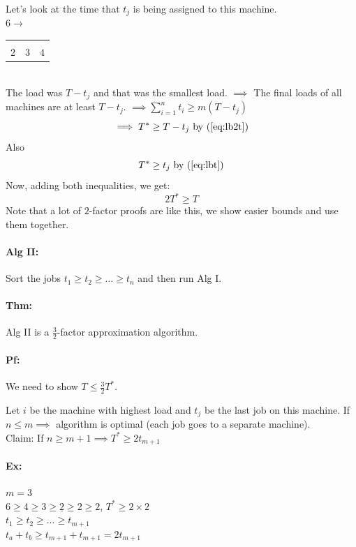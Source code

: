\documentclass[12 pt]{article}
\begin{document}
          Let's look at the time that $t_j$ is being assigned to this
          machine.
          \\ $6 \to$ 
          \begin{tabular}{|l|l|l|}
            &&
            \\$2$ & $3$ & $4$
            \\ \hline
          \end{tabular}
          \\ The load was $T-t_j$ and that was the smallest
          load. $\implies$ The final loads of all machines are at
          least $T-t_j$. $\implies \sum_{i=1}^n t_i \geq m(T-t_j)$
          $$\implies T^* \geq T- t_j \text{ by (\ref{eq:lb2t})}$$
          Also
          $$T^* \geq t_j \text{ by (\ref{eq:lbt})}$$
          Now, adding both inequalities, we get:
          $$2T^* \geq T$$
          Note that a lot of $2$-factor proofs are like this, we show
          easier bounds and use them together.
          \paragraph{Alg II:} Sort the jobs $t_1 \geq t_2 \geq \ldots
          \geq t_n$ and then run Alg I.
          \paragraph{Thm:} Alg II is a $\frac{3}{2}$-factor
          approximation algorithm.
          \paragraph{Pf:} We need to show $T \leq \frac{3}{2}T^*$.

          Let $i$ be the machine with highest load and $t_j$ be the
          last job on this machine. If $n \leq m \implies$ algorithm
          is optimal (each job goes to a separate machine).
          \\ Claim: If $n \geq m+1 \implies T^* \geq 2t_{m+1}$
          \paragraph{Ex:} $m=3$
          \\$ 6 \geq 4 \geq 3 \geq \underline{2}
          \geq 2 \geq 2$, $T^* \geq 2 \times 2$
          \\ $t_1 \geq t_2 \geq \ldots \geq t_{m+1}$
          \\ $t_a +t_b \geq t_{m+1}+t_{m+1} = 2t_{m+1}$
\end{document}
